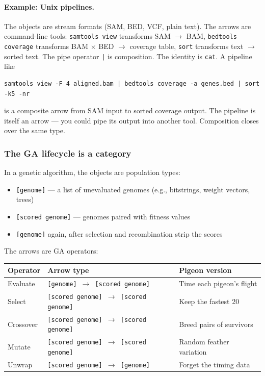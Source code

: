 \documentclass[10pt]{article}
\begin{document}
\paragraph{Example: Unix pipelines.} The objects are stream formats (SAM, BED, VCF, plain text). The arrows are command-line tools: \texttt{samtools view} transforms SAM $\to$ BAM, \texttt{bedtools coverage} transforms BAM $\times$ BED $\to$ coverage table, \texttt{sort} transforms text $\to$ sorted text. The pipe operator \texttt{|} is composition. The identity is \texttt{cat}. A pipeline like

\begin{lstlisting}[style=plainstyle]
samtools view -F 4 aligned.bam | bedtools coverage -a genes.bed | sort -k5 -nr
\end{lstlisting}

\noindent is a composite arrow from SAM input to sorted coverage output. The pipeline is itself an arrow --- you could pipe its output into another tool. Composition closes over the same type.

\subsubsection*{The GA lifecycle is a category}

In a genetic algorithm, the objects are population types:

\begin{itemize}
  \item \texttt{[genome]} --- a list of unevaluated genomes (e.g., bitstrings, weight vectors, trees)
  \item \texttt{[scored genome]} --- genomes paired with fitness values
  \item \texttt{[genome]} again, after selection and recombination strip the scores
\end{itemize}

The arrows are GA operators:

\begin{table}[ht]
\centering
\begin{tabular}{@{}lll@{}}
\toprule
\textbf{Operator} & \textbf{Arrow type} & \textbf{Pigeon version} \\
\midrule
Evaluate  & \texttt{[genome] $\to$ [scored genome]} & Time each pigeon's flight \\
Select    & \texttt{[scored genome] $\to$ [scored genome]} & Keep the fastest 20 \\
Crossover & \texttt{[scored genome] $\to$ [scored genome]} & Breed pairs of survivors \\
Mutate    & \texttt{[scored genome] $\to$ [scored genome]} & Random feather variation \\
Unwrap    & \texttt{[scored genome] $\to$ [genome]} & Forget the timing data \\
\bottomrule
\end{tabular}
\end{table}
\end{document}
